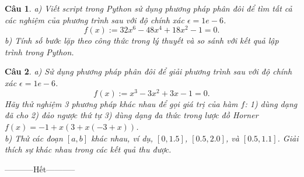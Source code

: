 \documentclass[11pt]{article}
\newtheorem{bt}{Câu}
\begin{document}
\begin{bt}
a) Viết script trong Python sử dụng phương pháp phân đôi để tìm tất cả các nghiệm của phương trình sau với độ chính xác $\epsilon=1e-6$.
\[ f(x) := 32x^6 - 48x^4 +18x^2 - 1 = 0.  \] 
b) Tính số bước lặp theo công thức trong lý thuyết và so sánh với kết quả lập trình trong Python.
\end{bt}

\begin{bt} %
a) Sử dụng phương pháp phân đôi để giải phương trình sau với độ chính xác $\epsilon=1e-6$. 
%
\[ f(x) := x^3-3x^2+3x-1 = 0. \]
%
Hãy thử nghiệm 3 phương pháp khác nhau để gọi giá trị của hàm $f$: 1) dùng dạng đã cho 2) đảo ngược thứ tự 3) dùng dạng đa thức trong lược đồ Horner $f(x) = -1+x(3+x(-3+x))$. \\
b) Thử các đoạn $[a,b]$ khác nhau, ví dụ, $[0, 1.5]$, $[0.5, 2.0]$, và $[0.5, 1.1]$. Giải thích sự khác nhau trong các kết quả thu được. 
\end{bt}

\centerline{-----------Hết-----------}

% 
   
\end{document}
